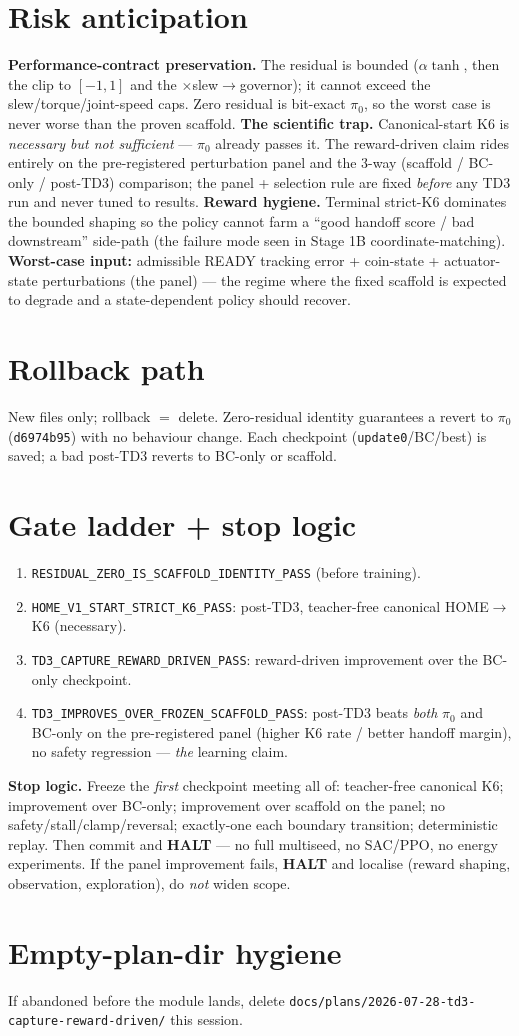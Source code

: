 \documentclass[11pt]{article}
\newcommand{\code}[1]{\texttt{\small #1}}
\newcommand{\halt}{\textcolor{red!70!black}{\textbf{HALT}}}
\begin{document}
\section{Risk anticipation}
\textbf{Performance-contract preservation.} The residual is bounded ($\alpha\tanh$, then the clip to $[-1,1]$ and the
$\times$slew$\to$governor); it cannot exceed the slew/torque/joint-speed caps. Zero residual is bit-exact $\pi_0$, so the
worst case is never worse than the proven scaffold. \textbf{The scientific trap.} Canonical-start K6 is \emph{necessary
but not sufficient} --- $\pi_0$ already passes it. The reward-driven claim rides entirely on the pre-registered
perturbation panel and the 3-way (scaffold / BC-only / post-TD3) comparison; the panel + selection rule are fixed
\emph{before} any TD3 run and never tuned to results. \textbf{Reward hygiene.} Terminal strict-K6 dominates the bounded
shaping so the policy cannot farm a ``good handoff score / bad downstream'' side-path (the failure mode seen in Stage 1B
coordinate-matching). \textbf{Worst-case input:} admissible READY tracking error + coin-state + actuator-state
perturbations (the panel) --- the regime where the fixed scaffold is expected to degrade and a state-dependent policy
should recover.

\section{Rollback path}
New files only; rollback $=$ delete. Zero-residual identity guarantees a revert to $\pi_0$ (\code{d6974b95}) with no
behaviour change. Each checkpoint (\code{update0}/BC/best) is saved; a bad post-TD3 reverts to BC-only or scaffold.

\section{Gate ladder + stop logic}
\begin{enumerate}[nosep,leftmargin=1.6em]
  \item \code{RESIDUAL\_ZERO\_IS\_SCAFFOLD\_IDENTITY\_PASS} (before training).
  \item \code{HOME\_V1\_START\_STRICT\_K6\_PASS}: post-TD3, teacher-free canonical HOME$\to$K6 (necessary).
  \item \code{TD3\_CAPTURE\_REWARD\_DRIVEN\_PASS}: reward-driven improvement over the BC-only checkpoint.
  \item \code{TD3\_IMPROVES\_OVER\_FROZEN\_SCAFFOLD\_PASS}: post-TD3 beats \emph{both} $\pi_0$ and BC-only on the
  pre-registered panel (higher K6 rate / better handoff margin), no safety regression --- \emph{the} learning claim.
\end{enumerate}
\textbf{Stop logic.} Freeze the \emph{first} checkpoint meeting all of: teacher-free canonical K6; improvement over
BC-only; improvement over scaffold on the panel; no safety/stall/clamp/reversal; exactly-one each boundary transition;
deterministic replay. Then commit and \halt{} --- no full multiseed, no SAC/PPO, no energy experiments. If the panel
improvement fails, \halt{} and localise (reward shaping, observation, exploration), do \emph{not} widen scope.

\section{Empty-plan-dir hygiene}
If abandoned before the module lands, delete \code{docs/plans/2026-07-28-td3-capture-reward-driven/} this session.
\end{document}
